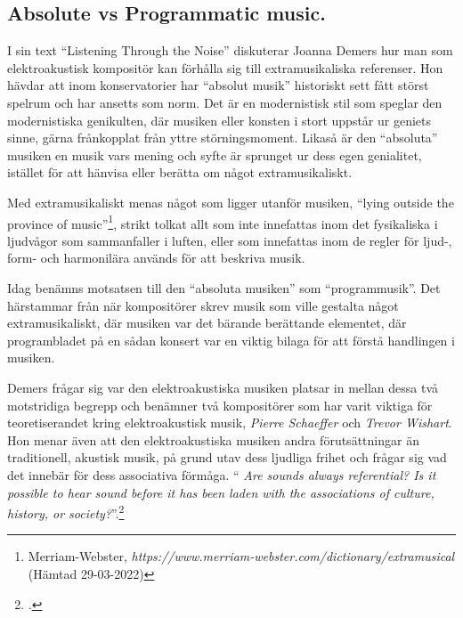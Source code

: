 \documentclass{article}
\begin{document}



\subsection{Absolute vs Programmatic music.}
I sin text ``Listening Through the Noise'' diskuterar Joanna Demers hur man som elektroakustisk kompositör kan
förhålla sig till extramusikaliska referenser. Hon hävdar att inom konservatorier har ``absolut musik''
historiskt sett fått störst spelrum och har ansetts som norm. Det är en modernistisk stil som speglar den
modernistiska genikulten, där musiken eller konsten i stort uppstår ur geniets sinne, gärna frånkopplat från
yttre störningsmoment. Likaså är den ``absoluta'' musiken en musik vars mening och syfte är sprunget ur dess
egen genialitet, istället för att hänvisa eller berätta om något extramusikaliskt.

Med extramusikaliskt menas något som ligger utanför musiken, ``lying outside the province of
music''\footnote{Merriam-Webster, \emph{https://www.merriam-webster.com/dictionary/extramusical} (Hämtad
29-03-2022)}, strikt tolkat allt som inte innefattas inom det fysikaliska i ljudvågor som sammanfaller i
luften, eller som innefattas inom de regler för ljud-, form- och harmonilära används för att beskriva musik. 

Idag benämns motsatsen till den ``absoluta musiken'' som ``programmusik''. Det härstammar från när
kompositörer skrev musik som ville gestalta något extramusikaliskt, där musiken var det bärande berättande elementet, där programbladet på en sådan konsert var en viktig bilaga
för att förstå handlingen i musiken. 

Demers frågar sig var den elektroakustiska musiken platsar in mellan dessa två motstridiga begrepp och
benämner två kompositörer som har varit viktiga för teoretiserandet kring elektroakustisk musik, \emph{Pierre
Schaeffer} och \emph{Trevor Wishart}. Hon menar även att den elektroakustiska musiken andra förutsättningar än
traditionell, akustisk musik, på grund utav dess ljudliga frihet och frågar sig
vad det innebär för dess associativa förmåga. ``
\emph{Are sounds always referential? Is it possible to hear sound before it has been laden with the
associations of culture, history, or society?}''.\footcite[23]{JoannaDemers}
\end{document}
